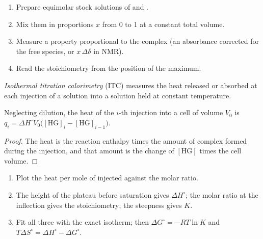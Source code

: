 \begin{method}\label{met:b3:supramolecular:job}
\begin{enumerate}
  \item Prepare equimolar stock solutions of  and .
  \item Mix them in proportions $x$ from 0 to 1 at a constant total volume.
  \item Measure a property proportional to the complex (an absorbance corrected
        for the free species, or $x\,\Delta\delta$ in NMR).
  \item Read the stoichiometry from the position of the maximum.
\end{enumerate}
\end{method}

\begin{definition}\label{def:b3:supramolecular:itc}
\emph{Isothermal titration calorimetry}
(ITC) measures the heat released or absorbed at each injection of a 
solution into a  solution held at constant temperature.
\end{definition}

\begin{proposition}\label{prop:b3:supramolecular:itc}
Neglecting dilution, the heat of the $i$-th injection into a cell of volume $V_0$ is
$q_i = \Delta H^\circ V_0\bigl([\mathrm{HG}]_i - [\mathrm{HG}]_{i-1}\bigr)$.
\end{proposition}

\begin{proof}
The heat is the reaction enthalpy times the amount of complex formed during the
injection, and that amount is the change of $[\mathrm{HG}]$ times the cell volume.
\end{proof}

\begin{method}\label{met:b3:supramolecular:itc}
\begin{enumerate}
  \item Plot the heat per mole of injected  against the molar ratio.
  \item The height of the plateau before saturation gives $\Delta H^\circ$; the molar ratio at
        the inflection gives the stoichiometry; the steepness gives $K$.
  \item Fit all three with the exact isotherm; then $\Delta G^\circ = -RT\ln K$ and
        $T\Delta S^\circ = \Delta H^\circ - \Delta G^\circ$.
\end{enumerate}
\end{method}

